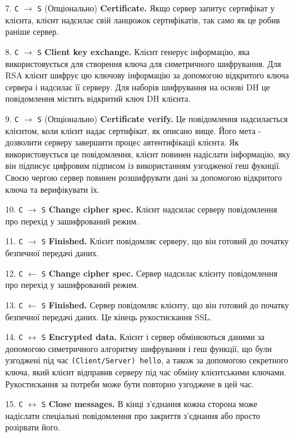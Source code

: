 \begin{enumerate}
    \item[7. \texttt{С} $\longrightarrow$ \texttt{S}] (Опціонально) \textbf{Certificate.} Якщо сервер запитує сертифікат у клієнта, клієнт надсилає свій ланцюжок сертифікатів, так само як це робив раніше сервер.
    \item[8. \texttt{С} $\longrightarrow$ \texttt{S}] \textbf{Client key exchange.} Клієнт генерує інформацію, яка використовується для створення ключа для симетричного шифрування. Для RSA клієнт шифрує цю ключову інформацію за допомогою відкритого ключа сервера і надсилає її серверу. Для наборів шифрування на основі DH це повідомлення містить відкритий ключ DH клієнта.
    \item[9. \texttt{С} $\longrightarrow$ \texttt{S}] (Опціонально) \textbf{Certificate verify.} Це повідомлення надсилається клієнтом, коли клієнт надає сертифікат, як описано вище. Його мета - дозволити серверу завершити процес автентифікації клієнта. Як використовується це повідомлення, клієнт повинен надіслати інформацію, яку він підписує цифровим підписом із використанням узгодженої геш фукнції. Своєю чергою сервер повинен розшифрувати дані за допомогою відкритого ключа та верифікувати їх.
    \item[10. \texttt{С} $\longrightarrow$ \texttt{S}] \textbf{Change cipher spec.} Клієнт надсилає серверу повідомлення про перехід у зашифрований режим.
    \item[11. \texttt{С} $\longrightarrow$ \texttt{S}] \textbf{Finished.} Клієнт повідомляє серверу, що він готовий до початку безпечної передачі даних.
    \item[12. \texttt{С} $\longleftarrow$ \texttt{S}] \textbf{Change cipher spec.} Сервер надсилає клієнту повідомлення про перехід у зашифрований режим.
    \item[13. \texttt{С} $\longleftarrow$ \texttt{S}] \textbf{Finished.} Сервер повідомляє клієнту, що він готовий до початку безпечної передачі даних. Це кінець рукостискання SSL.
    \item[14. \texttt{С} $\longleftrightarrow$ \texttt{S}] \textbf{Encrypted data.} Клієнт і сервер обмінюються даними за допомогою симетричного алгоритму шифрування і геш функції, що були узгоджені під час \texttt{(Client/Server) hello}, а також за допомогою секретного ключа, який клієнт відправив серверу під час обміну клієнтськими ключами. Рукостискання за потреби може бути повторно узгоджене в цей час.
    \item[15. \texttt{С} $\longleftrightarrow$ \texttt{S}] \textbf{Close messages.} В кінці з'єднання кожна сторона може надіслати спеціальні повідомлення про закриття з'єднання або просто розірвати його.
\end{enumerate}
